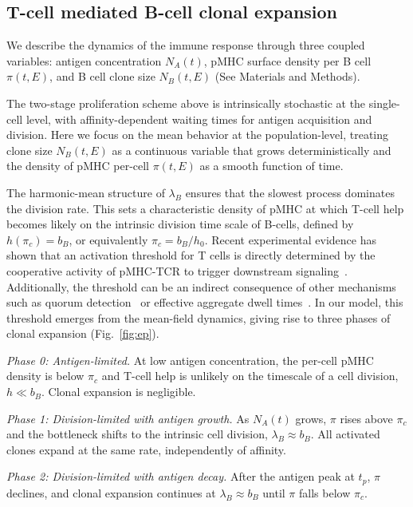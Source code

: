 \documentclass[aps, pre, twocolumn, 10pt, groupedaddress, superscriptaddress, linenumbers]{revtex4-2}
\newcommand{\DG}{E}
\begin{document}
\subsection*{T-cell mediated B-cell clonal expansion}
We describe the dynamics of the immune response through three coupled variables: antigen concentration $N_A(t)$, pMHC surface density per B cell $\pi(t, \DG)$, and B cell clone size $N_B(t, \DG)$ (See Materials and Methods).

The two-stage proliferation scheme above is intrinsically stochastic at the single-cell level, with affinity-dependent waiting times for antigen acquisition and division.
Here we focus on the mean behavior at the population-level, treating clone size $N_B(t, \DG)$ as a continuous variable that grows deterministically and the density of pMHC per-cell $\pi(t, \DG)$ as a smooth function of time.

The harmonic-mean structure of $\lambda_B$ ensures that the slowest process dominates the division rate.
This sets a characteristic density of pMHC at which T-cell help becomes likely on the intrinsic division time scale of B-cells, defined by $h(\pi_c) = b_B$, or equivalently $\pi_c = b_B/h_0$.
Recent experimental evidence has shown that an activation threshold for T cells is directly determined by the cooperative activity of pMHC-TCR to trigger downstream signaling~\cite{wither_antigen_2023, white_proofreading_2025}.
Additionally, the threshold can be an indirect consequence of other mechanisms such as quorum detection~\cite{Butler_2013_Tcells_QS} or effective aggregate dwell times~\cite{govern_fast_2010}.
In our model, this threshold emerges from the mean-field dynamics, giving rise to three phases of clonal expansion (Fig.~\ref{fig:ep}).

\textit{Phase 0: Antigen-limited.} At low antigen concentration, the per-cell pMHC density is below $\pi_c$ and T-cell help is unlikely on the timescale of a cell division, $h \ll b_B$. Clonal expansion is negligible.

\textit{Phase 1: Division-limited with antigen growth.} As $N_A(t)$ grows, $\pi$ rises above $\pi_c$ and the bottleneck shifts to the intrinsic cell division, $\lambda_B \approx b_B$. All activated clones expand at the same rate, independently of affinity.

\textit{Phase 2: Division-limited with antigen decay.} After the antigen peak at $t_p$, $\pi$ declines, and clonal expansion continues at $\lambda_B \approx b_B$ until $\pi$ falls below $\pi_c$.
\end{document}
